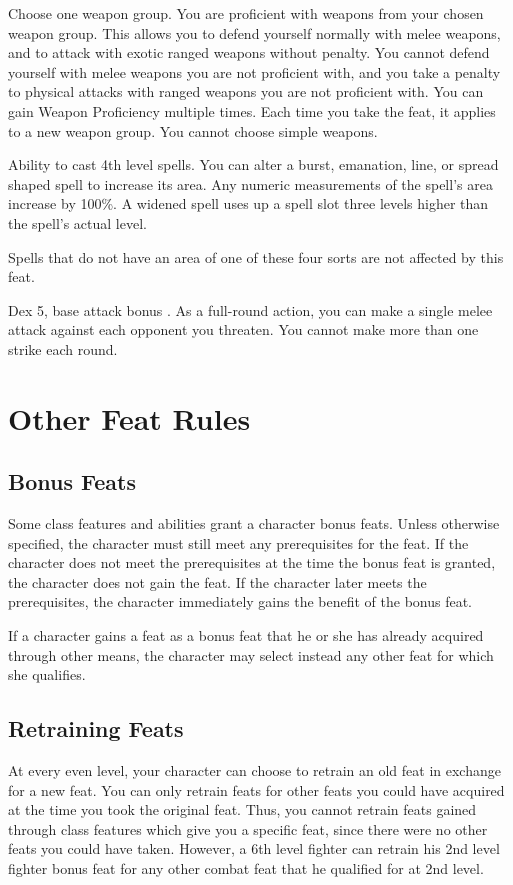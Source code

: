 Choose one weapon group.
 You are proficient with weapons from your chosen weapon group. This allows you to defend yourself normally with melee weapons, and to attack with exotic ranged weapons without penalty.
 You cannot defend yourself with melee weapons you are not proficient with, and you take a  penalty to physical attacks with ranged weapons you are not proficient with.
 You can gain Weapon Proficiency multiple times. Each time you take the feat, it applies to a new weapon group. You cannot choose simple weapons.

 Ability to cast 4th level spells.
 You can alter a burst, emanation, line, or spread shaped spell to increase its area. Any numeric measurements of the spell's area increase by 100\%. A widened spell uses up a spell slot three levels higher than the spell's actual level.
\par Spells that do not have an area of one of these four sorts are not affected by this feat.

 Dex 5, base attack bonus .
 As a full-round action, you can make a single melee attack against each opponent you threaten. You cannot make more than one strike each round.

\section{Other Feat Rules}

\subsection{Bonus Feats}
Some class features and abilities grant a character bonus feats. Unless otherwise specified, the character must still meet any prerequisites for the feat. If the character does not meet the prerequisites at the time the bonus feat is granted, the character does not gain the feat. If the character later meets the prerequisites, the character immediately gains the benefit of the bonus feat.

If a character gains a feat as a bonus feat that he or she has already acquired through other means, the character may select instead any other feat for which she qualifies.

\subsection{Retraining Feats}
At every even level, your character can choose to retrain an old feat in exchange for a new feat. You can only retrain feats for other feats you could have acquired at the time you took the original feat. Thus, you cannot retrain feats gained through class features which give you a specific feat, since there were no other feats you could have taken. However, a 6th level fighter can retrain his 2nd level fighter bonus feat for any other combat feat that he qualified for at 2nd level.
